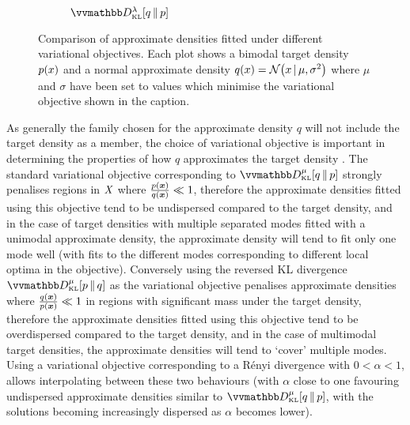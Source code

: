 \begin{figure}[t]
\begin{subfigure}[b]{.32\linewidth}
\caption{$\kldiv[\lambda]{q}{\tgtdens}$}
\label{sfig:var-obj-kl-qp}
\end{subfigure}
\caption[Variational objective comparison.]{Comparison of approximate densities fitted under different variational objectives. Each plot shows a bimodal target density $p(x)$ and a normal approximate density $q(x) = \nrm{x \gvn \mu,\sigma^2}$ where $\mu$ and $\sigma$ have been set to values which minimise the variational objective shown in the caption.}
\label{fig:variational-objective-comparison}
\end{figure}

As generally the family chosen for the approximate density $q$ will not include the target density as a member, the choice of variational objective is important in determining the properties of how $q$ approximates the target density \citep{bishop2006pattern}. The standard variational objective corresponding to $\kldiv[\mu]{q}{\tgtdens}$ strongly penalises regions in $\mathit{X}$ where $\frac{p(\boldsymbol{x})}{q(\boldsymbol{x})} \ll  1$, therefore the approximate densities fitted using this objective tend to be undispersed compared to the target density, and in the case of target densities with multiple separated modes fitted with a unimodal approximate density, the approximate density will tend to fit only one mode well (with fits to the different modes corresponding to different local optima in the objective). Conversely using the reversed \ac{KL} divergence $\kldiv[\mu]{\tgtdens}{q}$ as the variational objective penalises approximate densities where $\frac{q(\boldsymbol{x})}{p(\boldsymbol{x})} \ll 1$ in regions with significant mass under the target density, therefore the approximate densities fitted using this objective tend to be overdispersed compared to the target density, and in the case of multimodal target densities, the approximate densities will tend to `cover' multiple modes. Using a variational objective corresponding to a R\'{e}nyi divergence with $0 < \alpha < 1$, allows interpolating between these two behaviours (with $\alpha$ close to one favouring undispersed approximate densities similar to $\kldiv[\mu]{q}{\tgtdens}$, with the solutions becoming increasingly dispersed as $\alpha$ becomes lower). 

